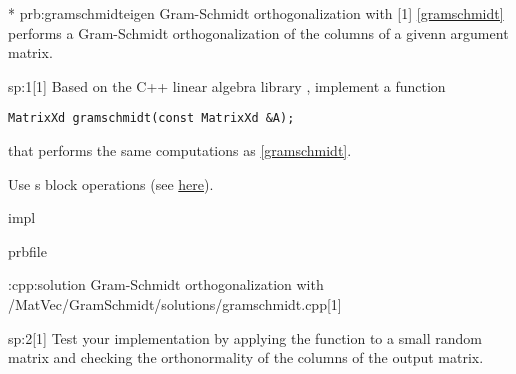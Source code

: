 \begin{samproblem}*
  {prb:gramschmidteigen}
  {Gram-Schmidt orthogonalization with \eigen{}}[1]
  {
    \cref{gramschmidt} performs a Gram-Schmidt
    orthogonalization of the columns of a givenn argument matrix.
  }

\begin{subproblem}{sp:1}[1]
  Based on the C++ linear algebra library \eigen{}, implement a function
  \begin{lstlisting}[style=cpp]
MatrixXd gramschmidt(const MatrixXd &A);
  \end{lstlisting}
  that performs the same computations as \cref{gramschmidt}.

  Use \eigen{}s block operations
  (see \href{https://eigen.tuxfamily.org/dox/group__TutorialBlockOperations.html}
  {here}).

  \begin{samwriteprbpart}{impl}
    \begin{writeverbatim}{prbfile}
      \begin{samsolution}
        \begin{samcode}[C++-code]{\cpl:cpp:solution}
          {Gram-Schmidt orthogonalization with \eigen{}}
          \samincludecpp
          {\codes/MatVec/GramSchmidt/solutions/gramschmidt.cpp}[1]
        \end{samcode}
      \end{samsolution}
    \end{writeverbatim}
  \end{samwriteprbpart}
\end{subproblem}

\begin{subproblem}{sp:2}[1]
  \label{sp:strassen:2}
  Test your implementation by applying the function 
  to a small random matrix
  and checking the orthonormality of the columns of the output
  matrix.


\end{subproblem}
\end{samproblem}
